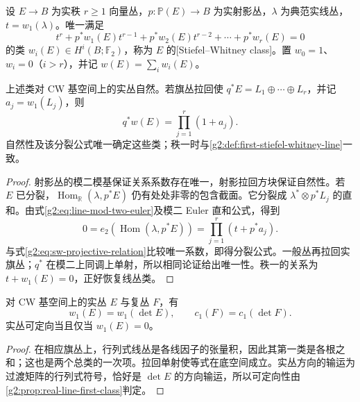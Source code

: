 \begin{definition}\label{g2:def:stiefel-whitney-projective}
	设 \(E\to B\) 为实秩 \(r\ge1\) 向量丛，\(p:\mathbb P(E)\to B\) 为实射影丛，\(\lambda\) 为典范实线丛，\(t=w_1(\lambda)\)。唯一满足
	\begin{equation}\label{g2:eq:sw-projective-relation}
		t^r+p^*w_1(E)t^{r-1}+p^*w_2(E)t^{r-2}+\cdots+p^*w_r(E)=0
	\end{equation}
	的类 \(w_i(E)\in H^i(B;\mathbb F_2)\)，称为 \(E\) 的[Stiefel--Whitney class]。置 \(w_0=1\)、\(w_i=0\)（\(i>r\)），并记 \(w(E)=\sum_iw_i(E)\)。
\end{definition}

\begin{theorem}\label{g2:thm:stiefel-whitney-construction}
	上述类对 CW 基空间上的实丛自然。若旗丛拉回使 \(q^*E=L_1\oplus\cdots\oplus L_r\)，并记 \(a_j=w_1(L_j)\)，则
	\begin{equation}\label{g2:eq:sw-root-formula}
		q^*w(E)=\prod_{j=1}^r(1+a_j).
	\end{equation}
	自然性及该分裂公式唯一确定这些类；秩一时与\cref{g2:def:first-stiefel-whitney-line}一致。
\end{theorem}
\begin{proof}
	射影丛的模二模基保证关系系数存在唯一，射影拉回方块保证自然性。若 \(E\) 已分裂，\(\operatorname{Hom}_{\mathbb R}(\lambda,p^*E)\) 仍有处处非零的包含截面。它分裂成 \(\lambda^*\otimes p^*L_j\) 的直和。由式\eqref{g2:eq:line-mod-two-euler}及模二 Euler 直和公式，得到
	\[
		0=e_2(\operatorname{Hom}(\lambda,p^*E))
		=\prod_{j=1}^r(t+p^*a_j).
	\]
	与式\eqref{g2:eq:sw-projective-relation}比较唯一系数，即得分裂公式。一般丛再拉回实旗丛；\(q^*\) 在模二上同调上单射，所以相同论证给出唯一性。秩一的关系为 \(t+w_1(E)=0\)，正好恢复线丛类。
\end{proof}

\begin{proposition}\label{g2:prop:first-classes-determinants}
	对 CW 基空间上的实丛 \(E\) 与复丛 \(F\)，有
	\[
		w_1(E)=w_1(\det E),\qquad c_1(F)=c_1(\det F).
	\]
	实丛可定向当且仅当 \(w_1(E)=0\)。
\end{proposition}
\begin{proof}
	在相应旗丛上，行列式线丛是各线因子的张量积，因此其第一类是各根之和；这也是两个总类的一次项。拉回单射使等式在底空间成立。实丛方向的输运为过渡矩阵的行列式符号，恰好是 \(\det E\) 的方向输运，所以可定向性由\cref{g2:prop:real-line-first-class}判定。
\end{proof}

